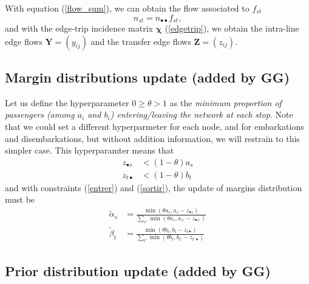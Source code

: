 \documentclass{bmcart}
\begin{document}
With equation (\ref{flow_sum}), we can obtain the flow associated to $f_{st}$
\begin{equation}
	\label{flow_from_distrib}
	n_{st} = n_{\bullet \bullet} f_{st}, 
\end{equation}
and with the edge-trip incidence matrix $\bm{\chi}$ (\ref{edgetrip}), we obtain the intra-line edge flows $\mathbf{Y}=(y_{ij})$ and the transfer edge flows $\mathbf{Z}=(z_{ij})$.

\subsection{Margin distributions update (added by GG)}

Let us define the hyperparameter $0 \geq \theta > 1$ as the \emph{minimum proportion of passengers (among $a_i$ and $b_i$) entering/leaving the network at each stop}. Note that we could set a different hyperparmeter for each node, and for embarkations and disembarkations, but without addition information, we will restrain to this simpler case. This hyperparamter means that
\begin{align}
	z_{\bullet s} &< (1 - \theta) a_s \\
	z_{t \bullet} &< (1 - \theta) b_t
\end{align}
and with constraints (\ref{entrer}) and (\ref{sortir}), the update of margins distribution must be
\begin{align}
	\widetilde{\alpha}_s &= \frac{\min(\theta a_s, a_s - z_{\bullet s})}{\sum_{s'} \min(\theta a_s, a_{s'} - z_{\bullet {s'}})} \label{alpha_update} \\
	\widetilde{\beta}_t &= \frac{\min(\theta b_t, b_t - z_{t \bullet})}{\sum_{t'} \min(\theta b_t, b_{t'} - z_{{t'} \bullet})} \label{beta_update}
\end{align}

\subsection{Prior distribution update (added by GG)}
\end{document}
